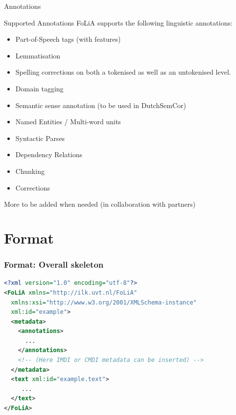 \documentclass[compress]{beamer}
\begin{document}
\begin{frame}{Annotations}
    \begin{block}{Supported Annotations}
        FoLiA supports the following linguistic annotations:
        \begin{itemize}
            \item Part-of-Speech tags (with features)
            \item Lemmatisation
            \item Spelling corrections on both a tokenised as well as an untokenised level.
            \item Domain tagging
            \item Semantic sense annotation (to be used in DutchSemCor)
            \item Named Entities / Multi-word units
            \item Syntactic Parses
            \item Dependency Relations
            \item Chunking
            \item Corrections
        \end{itemize}
    
        More to be added when needed (in collaboration with partners)

    \end{block}
\end{frame}

\section{Format}

\begin{frame}[fragile]
\frametitle{Format: Overall skeleton}
\begin{lstlisting}[language=xml]
<?xml version="1.0" encoding="utf-8"?>
<FoLiA xmlns="http://ilk.uvt.nl/FoLiA"
  xmlns:xsi="http://www.w3.org/2001/XMLSchema-instance"
  xml:id="example">
  <metadata>    
    <annotations>
      ...
    </annotations>    
    <!-- (Here IMDI or CMDI metadata can be inserted) -->
  </metadata>
  <text xml:id="example.text">
     ...
  </text>
</FoLiA>  
\end{lstlisting}
\end{frame}
\end{document}
